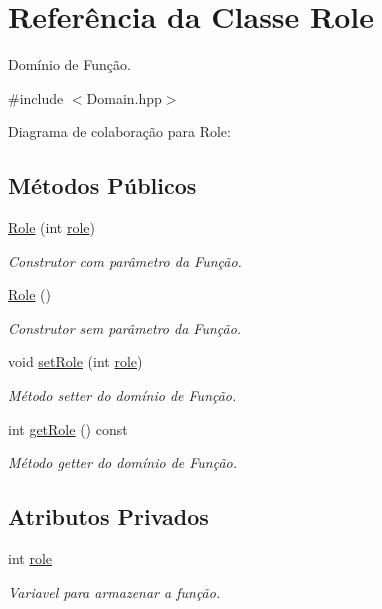 \hypertarget{classRole}{}\section{Referência da Classe Role}
\label{classRole}


Domínio de Função.  




{\ttfamily \#include $<$Domain.\+hpp$>$}



Diagrama de colaboração para Role\+:
\subsection*{Métodos Públicos}
\begin{DoxyCompactItemize}
\item 
\hyperlink{classRole_aa53892a736a3cca81d015cfb5e6ba241}{Role} (int \hyperlink{classRole_a19a26703a0776f3ee79ce0e057b908cb}{role})
\begin{DoxyCompactList}\small\item\em Construtor com parâmetro da Função. \end{DoxyCompactList}\item 
\hyperlink{classRole_a720f8920d5c6980dd3f380f4b060904a}{Role} ()
\begin{DoxyCompactList}\small\item\em Construtor sem parâmetro da Função. \end{DoxyCompactList}\item 
void \hyperlink{classRole_a202ba4ab34f0b4cdefc9a434f3e58f86}{set\+Role} (int \hyperlink{classRole_a19a26703a0776f3ee79ce0e057b908cb}{role})
\begin{DoxyCompactList}\small\item\em Método setter do domínio de Função. \end{DoxyCompactList}\item 
int \hyperlink{classRole_a9e7769617e1a42323d0b752bbe13b721}{get\+Role} () const 
\begin{DoxyCompactList}\small\item\em Método getter do domínio de Função. \end{DoxyCompactList}\end{DoxyCompactItemize}
\subsection*{Atributos Privados}
\begin{DoxyCompactItemize}
\item 
int \hyperlink{classRole_a19a26703a0776f3ee79ce0e057b908cb}{role}\hypertarget{classRole_a19a26703a0776f3ee79ce0e057b908cb}{}\label{classRole_a19a26703a0776f3ee79ce0e057b908cb}

\begin{DoxyCompactList}\small\item\em Variavel para armazenar a função. \end{DoxyCompactList}\end{DoxyCompactItemize}


